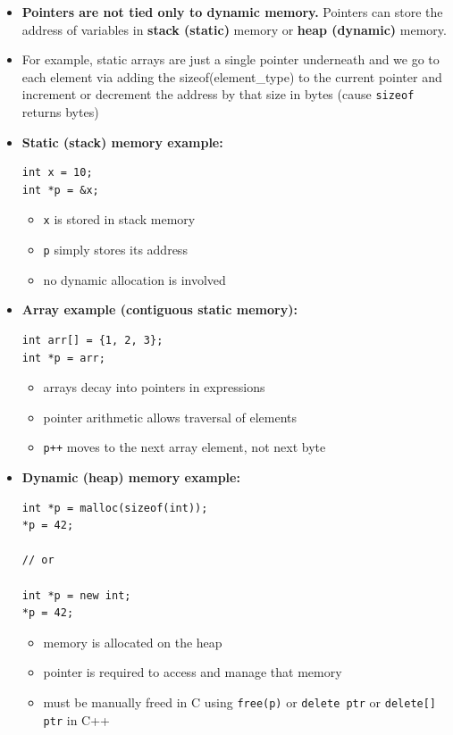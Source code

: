 \documentclass[10pt]{article}
\begin{document}
\begin{itemize}

\item \textbf{Pointers are not tied only to dynamic memory.}
Pointers can store the address of variables in \textbf{stack (static)} memory or \textbf{heap (dynamic)} memory.

\item For example, static arrays are just a single pointer underneath and we go to each element via adding the sizeof(element\_type) to the current pointer and increment or decrement the address by that size in bytes (cause \verb|sizeof| returns bytes)

\item \textbf{Static (stack) memory example:}
\begin{verbatim}
int x = 10;
int *p = &x;
\end{verbatim}

\begin{itemize}
    \item \verb|x| is stored in stack memory
    \item \verb|p| simply stores its address
    \item no dynamic allocation is involved
\end{itemize}

\item \textbf{Array example (contiguous static memory):}
\begin{verbatim}
int arr[] = {1, 2, 3};
int *p = arr;
\end{verbatim}

\begin{itemize}
    \item arrays decay into pointers in expressions
    \item pointer arithmetic allows traversal of elements
    \item \verb|p++| moves to the next array element, not next byte
\end{itemize}

\item \textbf{Dynamic (heap) memory example:}
\begin{verbatim}
int *p = malloc(sizeof(int));
*p = 42;

// or

int *p = new int;
*p = 42;
\end{verbatim}

\begin{itemize}
    \item memory is allocated on the heap
    \item pointer is required to access and manage that memory
    \item must be manually freed in C using \verb|free(p)| or \verb|delete ptr| or \verb|delete[] ptr| in C++
\end{itemize}


\end{itemize}
\end{document}
